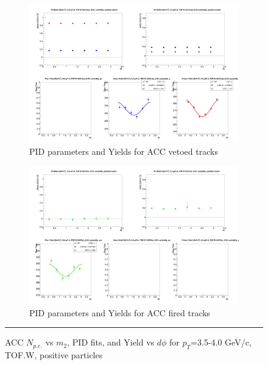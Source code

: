 \begin{figure}[H]
  \ContinuedFloat
    \begin{subfigure}{1\textwidth}
    \includegraphics[width=1\textwidth]{hiptfits/pos/fitParams_tof2_cent0_ch1_pT-35-40.jpg}
    \caption{PID parameters and Yields for ACC vetoed tracks}
    \end{subfigure}    
    \begin{subfigure}{1\textwidth}
    \includegraphics[width=1\textwidth]{hiptfits/pos/fitParams_tof3_cent0_ch1_pT-35-40.jpg}
    \caption{PID parameters and Yields for ACC fired tracks}
    \end{subfigure} 
    \rule{35em}{0.5pt}
  \caption[ACC $N_{p.e.}$ vs $m_2$, PID fits, and Yield vs $d\phi$ for $p_T$=3.5-4.0 GeV/c, TOF.W, positive particles]{ACC $N_{p.e.}$ vs $m_2$, PID fits, and Yield vs $d\phi$ for $p_T$=3.5-4.0 GeV/c, TOF.W, positive particles}
  \label{fig:acc35-40pos}
\end{figure}


